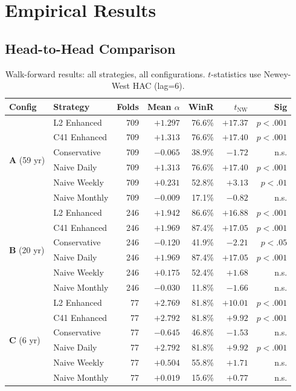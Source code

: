 \documentclass[11pt,a4paper]{article}
\begin{document}
\section{Empirical Results}

\subsection{Head-to-Head Comparison}

\begin{table}[H]
\centering
\caption{Walk-forward results: all strategies, all configurations. $t$-statistics use Newey-West HAC (lag=6).}
\label{tab:results}
\small
\begin{tabular}{llrrrrr}
\toprule
Config & Strategy & Folds & Mean $\alpha$ & WinR & $t_{\text{NW}}$ & Sig \\
\midrule
\multirow{6}{*}{\textbf{A} (59 yr)} 
  & L2 Enhanced   & 709 & $+1.297$ & 76.6\% & $+17.37$ & $p<.001$ \\
  & C41 Enhanced  & 709 & $+1.313$ & 76.6\% & $+17.40$ & $p<.001$ \\
  & Conservative  & 709 & $-0.065$ & 38.9\% & $-1.72$  & n.s. \\
  & Naive Daily   & 709 & $+1.313$ & 76.6\% & $+17.40$ & $p<.001$ \\
  & Naive Weekly  & 709 & $+0.231$ & 52.8\% & $+3.13$  & $p<.01$ \\
  & Naive Monthly & 709 & $-0.009$ & 17.1\% & $-0.82$  & n.s. \\
\midrule
\multirow{6}{*}{\textbf{B} (20 yr)}
  & L2 Enhanced   & 246 & $+1.942$ & 86.6\% & $+16.88$ & $p<.001$ \\
  & C41 Enhanced  & 246 & $+1.969$ & 87.4\% & $+17.05$ & $p<.001$ \\
  & Conservative  & 246 & $-0.120$ & 41.9\% & $-2.21$  & $p<.05$ \\
  & Naive Daily   & 246 & $+1.969$ & 87.4\% & $+17.05$ & $p<.001$ \\
  & Naive Weekly  & 246 & $+0.175$ & 52.4\% & $+1.68$  & n.s. \\
  & Naive Monthly & 246 & $-0.030$ & 11.8\% & $-1.66$  & n.s. \\
\midrule
\multirow{6}{*}{\textbf{C} (6 yr)}
  & L2 Enhanced   & 77 & $+2.769$ & 81.8\% & $+10.01$ & $p<.001$ \\
  & C41 Enhanced  & 77 & $+2.792$ & 81.8\% & $+9.92$  & $p<.001$ \\
  & Conservative  & 77 & $-0.645$ & 46.8\% & $-1.53$  & n.s. \\
  & Naive Daily   & 77 & $+2.792$ & 81.8\% & $+9.92$  & $p<.001$ \\
  & Naive Weekly  & 77 & $+0.504$ & 55.8\% & $+1.71$  & n.s. \\
  & Naive Monthly & 77 & $+0.019$ & 15.6\% & $+0.77$  & n.s. \\
\bottomrule
\end{tabular}
\end{table}
\end{document}
